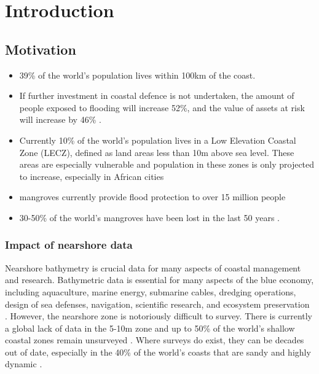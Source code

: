 \listoftodos

\chapter{Introduction}

\section{Motivation}
\begin{itemize}
      \item 39\% of the world's population lives within 100km of the coast.\parencite{Magdalena2021}
      \item If further investment in coastal defence is not undertaken, the amount of people exposed to flooding will increase 52\%, and the value of assets at risk will increase by 46\% \parencite{Kirezci2020}.
      \item Currently 10\% of the world's population lives in a Low Elevation Coastal Zone (LECZ), defined as land areas less than 10m above sea level. These areas are especially vulnerable and population in these zones is only projected to increase, especially in African cities \parencite{Neumann2015,Lichter2011}
      \item mangroves currently provide flood protection to over 15 million people \parencite{Menendez2020}
      \item 30-50\% of the world's mangroves have been lost in the last 50 years \parencite{}. 
\end{itemize}
\subsection{Impact of nearshore data}

Nearshore bathymetry is crucial data for many aspects of coastal management and research. Bathymetric data is essential for many aspects of the blue economy, including aquaculture, marine energy, submarine cables, dredging operations, design of sea defenses, navigation, scientific research, and ecosystem preservation \parencite{Cesbron2021,Ashphaq2021}. However, the nearshore zone is notoriously difficult to survey. There is currently a global lack of data in the 5-10m zone \parencite{Albright2021} and up to 50\% of the world's shallow coastal zones remain unsurveyed \parencite{IHO/OHI2022}. Where surveys do exist, they can be decades out of date, especially in the 40\% of the world's coasts that are sandy and highly dynamic \parencite{Almar2021e}.  


